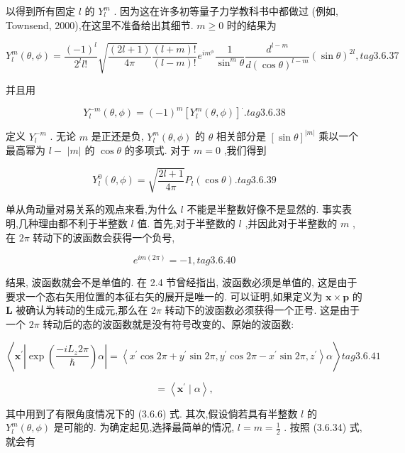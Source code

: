 以得到所有固定 $l$ 的 ${Y}_{l}^{m}$ . 因为这在许多初等量子力学教科书中都做过 (例如, Townsend, 2000),在这里不准备给出其细节. $m \geq 0$ 时的结果为

$$
{Y}_{l}^{m}\left( {\theta ,\phi }\right) = \frac{{\left( -1\right) }^{l}}{{2}^{l}l!}\sqrt{\frac{\left( 2l + 1\right) }{4\pi }\frac{\left( {l + m}\right) !}{\left( {l - m}\right) !}}{e}^{i{m}^{\phi }}\frac{1}{{\sin }^{m}\theta }\frac{{d}^{l - m}}{d{\left( \cos \theta \right) }^{l - m}}{\left( \sin \theta \right) }^{2l}, tag{3. 6.37}
$$

并且用

$$
{Y}_{l}^{-m}\left( {\theta ,\phi }\right) = {\left( -1\right) }^{m}{\left\lbrack {Y}_{l}^{m}\left( \theta ,\phi \right) \right\rbrack }^{ \cdot }. tag{3. 6.38}
$$

定义 ${Y}_{l}^{-m}$ . 无论 $m$ 是正还是负, ${Y}_{l}^{m}\left( {\theta ,\phi }\right)$ 的 $\theta$ 相关部分是 ${\left\lbrack \sin \theta \right\rbrack }^{\left| m\right| }$ 乘以一个最高幂为 $l -$ $\left| m\right|$ 的 $\cos \theta$ 的多项式. 对于 $m = 0$ ,我们得到

$$
{Y}_{l}^{0}\left( {\theta ,\phi }\right) = \sqrt{\frac{{2l} + 1}{4\pi }}{P}_{l}\left( {\cos \theta }\right) . tag{3. 6.39}
$$

单从角动量对易关系的观点来看,为什么 $l$ 不能是半整数好像不是显然的. 事实表明,几种理由都不利于半整数 $l$ 值. 首先,对于半整数的 $l$ ,并因此对于半整数的 $m$ ,在 ${2\pi }$ 转动下的波函数会获得一个负号,

$$
{e}^{{im}\left( {2\pi }\right) } = - 1, tag{3. 6.40}
$$

结果, 波函数就会不是单值的. 在 2.4 节曾经指出, 波函数必须是单值的, 这是由于要求一个态右矢用位置的本征右矢的展开是唯一的. 可以证明,如果定义为 $\mathbf{x} \times \mathbf{p}$ 的 $\mathbf{L}$ 被确认为转动的生成元,那么在 ${2\pi }$ 转动下的波函数必须获得一个正号. 这是由于一个 ${2\pi }$ 转动后的态的波函数就是没有符号改变的、原始的波函数:

$$
\left\langle {{\mathbf{x}}^{\prime }\left| {\exp \left( \frac{-i{L}_{z}{2\pi }}{\hslash }\right) \alpha }\right| = \left\langle {{x}^{\prime }\cos {2\pi } + {y}^{\prime }\sin {2\pi },{y}^{\prime }\cos {2\pi } - {x}^{\prime }\sin {2\pi },{z}^{\prime }}\right\rangle \alpha }\right\rangle tag{3. 6.41}
$$

$$
= \left\langle {{\mathbf{x}}^{\prime } \mid \alpha }\right\rangle ,
$$

其中用到了有限角度情况下的 (3.6.6) 式. 其次,假设倘若具有半整数 $l$ 的 ${Y}_{l}^{m}\left( {\theta ,\phi }\right)$ 是可能的. 为确定起见,选择最简单的情况, $l = m = \frac{1}{2}$ . 按照 (3.6.34) 式,就会有

